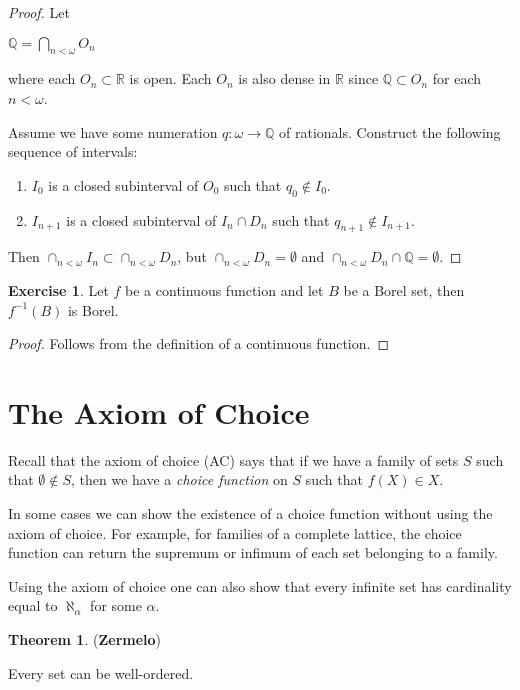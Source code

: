 \documentclass[8pt]{article}
\theoremstyle{definition}
\theoremstyle{definition}
\newtheorem{theorem}{Theorem}[section]
\theoremstyle{definition}
\theoremstyle{definition}
\theoremstyle{definition}
\theoremstyle{definition}
\theoremstyle{definition}
\theoremstyle{definition}
\theoremstyle{definition}
\theoremstyle{definition}
\theoremstyle{definition}
\theoremstyle{definition}
\theoremstyle{definition}
\newtheorem{exercise}{Exercise}[section]
\theoremstyle{definition}
\theoremstyle{question}
\begin{document}
\begin{proof}
  Let 
  \begin{center}
  $\mathbb{Q} = \bigcap \limits_{n < \omega} O_n$
  \end{center}
  where each $O_n \subset \mathbb{R}$ is open. Each $O_n$ is also dense in $\mathbb{R}$ since $\mathbb{Q} \subset O_n$
  for each $n < \omega$.

  Assume we have some numeration $q : \omega \to \mathbb{Q}$ of rationals. Construct the following sequence of intervals:
  \begin{enumerate}
    \item $I_0$ is a closed subinterval of $O_0$ such that $q_0 \notin I_0$.
    \item $I_{n + 1}$ is a closed subinterval of $I_n \cap D_n$ such that $q_{n + 1} \notin I_{n + 1}$.
  \end{enumerate}

  Then $\cap_{n < \omega} I_n \subset \cap_{n < \omega} D_n$, but $\cap_{n < \omega} D_n = \emptyset$ and
  $\cap_{n < \omega} D_n \cap \mathbb{Q} = \emptyset$.
\end{proof}

\begin{exercise}
  Let $f$ be a continuous function and let $B$ be a Borel set, then $f^{-1}(B)$ is Borel.
\end{exercise}

\begin{proof}
  Follows from the definition of a continuous function.
\end{proof}


\section{The Axiom of Choice}

Recall that the axiom of choice (AC) says that if we have a family of sets $S$ such that $\emptyset \notin S$, then
we have a \emph{choice function} on $S$ such that $f(X) \in X$.

In some cases we can show the existence of a choice function without using the axiom of choice. 
For example, for families of a complete lattice, the choice function can return the supremum or infimum of each set
belonging to a family.

Using the axiom of choice one can also show that every infinite set has cardinality equal to $\aleph_{\alpha}$ for some $\alpha$.

\begin{theorem}{({\bf Zermelo})}

  Every set can be well-ordered.
\end{theorem}
\end{document}
